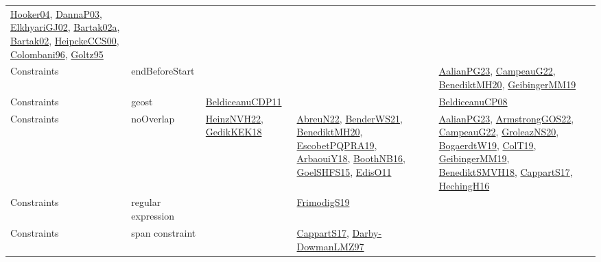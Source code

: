 {\begin{longtable}{lp{3cm}>{\raggedright}p{6cm}>{\raggedright}p{6cm}p{8cm}}
\href{papers/Hooker04.pdf}{Hooker04}\cite{Hooker04}, \href{papers/DannaP03.pdf}{DannaP03}\cite{DannaP03}, \href{papers/ElkhyariGJ02.pdf}{ElkhyariGJ02}\cite{ElkhyariGJ02}, \href{papers/Bartak02a.pdf}{Bartak02a}\cite{Bartak02a}, \href{papers/Bartak02.pdf}{Bartak02}\cite{Bartak02}, \href{articles/HeipckeCCS00.pdf}{HeipckeCCS00}\cite{HeipckeCCS00}, \href{papers/Colombani96.pdf}{Colombani96}\cite{Colombani96}, \href{papers/Goltz95.pdf}{Goltz95}\cite{Goltz95}\\
Constraints & endBeforeStart &  &  & \href{papers/AalianPG23.pdf}{AalianPG23}\cite{AalianPG23}, \href{articles/CampeauG22.pdf}{CampeauG22}\cite{CampeauG22}, \href{articles/BenediktMH20.pdf}{BenediktMH20}\cite{BenediktMH20}, \href{papers/GeibingerMM19.pdf}{GeibingerMM19}\cite{GeibingerMM19}\\
Constraints & geost & \href{articles/BeldiceanuCDP11.pdf}{BeldiceanuCDP11}\cite{BeldiceanuCDP11} &  & \href{papers/BeldiceanuCP08.pdf}{BeldiceanuCP08}\cite{BeldiceanuCP08}\\
Constraints & noOverlap & \href{articles/HeinzNVH22.pdf}{HeinzNVH22}\cite{HeinzNVH22}, \href{articles/GedikKEK18.pdf}{GedikKEK18}\cite{GedikKEK18} & \href{articles/AbreuN22.pdf}{AbreuN22}\cite{AbreuN22}, \href{papers/BenderWS21.pdf}{BenderWS21}\cite{BenderWS21}, \href{articles/BenediktMH20.pdf}{BenediktMH20}\cite{BenediktMH20}, \href{articles/EscobetPQPRA19.pdf}{EscobetPQPRA19}\cite{EscobetPQPRA19}, \href{papers/ArbaouiY18.pdf}{ArbaouiY18}\cite{ArbaouiY18}, \href{papers/BoothNB16.pdf}{BoothNB16}\cite{BoothNB16}, \href{articles/GoelSHFS15.pdf}{GoelSHFS15}\cite{GoelSHFS15}, \href{papers/EdisO11.pdf}{EdisO11}\cite{EdisO11} & \href{papers/AalianPG23.pdf}{AalianPG23}\cite{AalianPG23}, \href{papers/ArmstrongGOS22.pdf}{ArmstrongGOS22}\cite{ArmstrongGOS22}, \href{articles/CampeauG22.pdf}{CampeauG22}\cite{CampeauG22}, \href{papers/GroleazNS20.pdf}{GroleazNS20}\cite{GroleazNS20}, \href{papers/BogaerdtW19.pdf}{BogaerdtW19}\cite{BogaerdtW19}, \href{papers/ColT19.pdf}{ColT19}\cite{ColT19}, \href{papers/GeibingerMM19.pdf}{GeibingerMM19}\cite{GeibingerMM19}, \href{papers/BenediktSMVH18.pdf}{BenediktSMVH18}\cite{BenediktSMVH18}, \href{papers/CappartS17.pdf}{CappartS17}\cite{CappartS17}, \href{papers/HechingH16.pdf}{HechingH16}\cite{HechingH16}\\
Constraints & regular expression &  & \href{papers/FrimodigS19.pdf}{FrimodigS19}\cite{FrimodigS19} & \\
Constraints & span constraint &  & \href{papers/CappartS17.pdf}{CappartS17}\cite{CappartS17}, \href{articles/Darby-DowmanLMZ97.pdf}{Darby-DowmanLMZ97}\cite{Darby-DowmanLMZ97} & \\

\end{longtable}}
